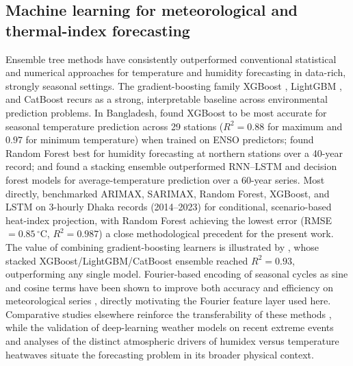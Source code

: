 \documentclass[pdflatex,sn-basic,lineno]{sn-jnl}
\newcommand{\degC}{\ensuremath{^{\circ}\mathrm{C}}}
\begin{document}
\subsection{Machine learning for meteorological and thermal-index forecasting}
Ensemble tree methods have consistently outperformed conventional statistical and
numerical approaches for temperature and humidity forecasting in data-rich,
strongly seasonal settings. The gradient-boosting family XGBoost
\citep{chen2016xgboost}, LightGBM \citep{ke2017lightgbm}, and CatBoost
\citep{prokhorenkova2018catboost} recurs as a strong, interpretable baseline
across environmental prediction problems. In Bangladesh, \citet{islam2026enso}
found XGBoost to be most accurate for seasonal temperature prediction across 29 stations
($R^{2}=0.88$ for maximum and $0.97$ for minimum temperature) when trained on ENSO
predictors; \citet{akter2025} found Random Forest best for humidity forecasting at
northern stations over a 40-year record; and \citet{rahman2024rnlstm} found a
stacking ensemble outperformed RNN--LSTM and decision forest models for
average-temperature prediction over a 60-year series. Most directly,
\citet{mollah2026mlheatindex} benchmarked ARIMAX, SARIMAX, Random Forest, XGBoost,
and LSTM on 3-hourly Dhaka records (2014--2023) for conditional, scenario-based
heat-index projection, with Random Forest achieving the lowest error
(RMSE~$=0.85\,\degC$, $R^{2}=0.987$) a close methodological precedent for the
present work. The value of combining gradient-boosting learners is illustrated by
\citet{kim2023toxins}, whose stacked XGBoost/LightGBM/CatBoost ensemble reached
$R^{2}=0.93$, outperforming any single model. Fourier-based encoding of seasonal
cycles as sine and cosine terms have been shown to improve both accuracy and
efficiency on meteorological series \citep{galansales2024}, directly motivating the
Fourier feature layer used here. Comparative studies elsewhere reinforce the
transferability of these methods \citep{hanoon2021ml,abdelsattar2025ml}, while the
validation of deep-learning weather models on recent extreme events
\citep{pasche2025validating} and analyses of the distinct atmospheric drivers of
humidex versus temperature heatwaves \citep{jeong2025humidex} situate the
forecasting problem in its broader physical context.
\end{document}
